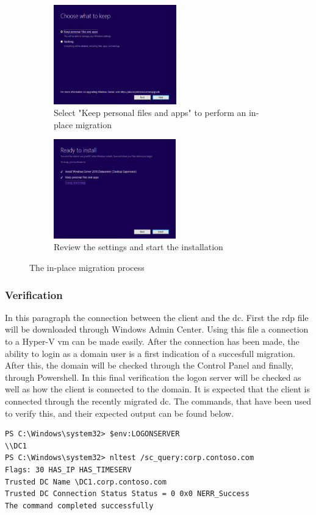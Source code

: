 \begin{figure}[h]\ContinuedFloat
	\begin{subfigure}{0.5\textwidth}
		\captionsetup{width=0.8\linewidth}
		\includegraphics[width=0.9\linewidth,height=4.3cm]{img/In-Place_WS_6.png} 
		\centering
		\caption{Select "Keep personal files and apps" to perform an in-place migration}
		\label{fig:inplace6}
	\end{subfigure}
	\begin{subfigure}{0.5\textwidth}
		\captionsetup{width=0.8\linewidth}
		\includegraphics[width=0.9\linewidth,height=4.3cm]{img/In-Place_WS_7.png}
		\centering
		\caption{Review the settings and start the installation}
		\label{fig:inplace7}
	\end{subfigure}
	\caption{The in-place migration process}
	\label{fig:inplace}
\end{figure}
\subsubsection{Verification}
In this paragraph the connection between the client and the \acrshort{dc}. First the \acrfull{rdp} file will be downloaded through Windows Admin Center. Using this file a connection to a Hyper-V \acrshort{vm} can be made easily. After the connection has been made, the ability to login as a domain user is a first indication of a succesfull migration. After this, the domain will be checked through the Control Panel and finally, through Powershell. In this final verification the logon server will be checked as well as how the client is connected to the domain. It is expected that the client is connected through the recently migrated \acrshort{dc}.
The commands, that have been used to verify this, and their expected output can be found below.
\begin{lstlisting}[breaklines]
PS C:\Windows\system32> $env:LOGONSERVER
\\DC1
PS C:\Windows\system32> nltest /sc_query:corp.contoso.com
Flags: 30 HAS_IP HAS_TIMESERV
Trusted DC Name \DC1.corp.contoso.com
Trusted DC Connection Status Status = 0 0x0 NERR_Success
The command completed successfully
\end{lstlisting}

